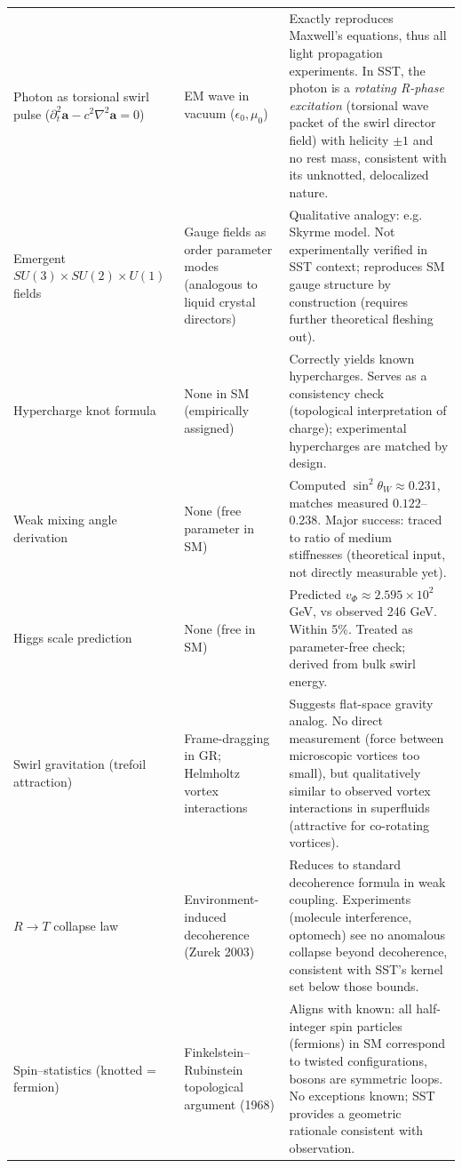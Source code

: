\documentclass[10pt,reprint,aps,onecolumn,nofootinbib]{revtex4-2}
\begin{document}
\begin{table}[hbt!]
\begin{ruledtabular}
\begin{tabular}{|p{3.0cm} p{4.0cm} p{8.0cm}|}
                Photon as torsional swirl pulse
                ($\partial_t^2 \mathbf{a}-c^2\nabla^2\mathbf{a}=0$)
                & EM wave in vacuum ($\epsilon_0,\mu_0$)
                & Exactly reproduces Maxwell’s equations, thus all light propagation experiments. In SST, the photon is a \emph{rotating R-phase excitation} (torsional wave packet of the swirl director field) with helicity $\pm 1$ and no rest mass, consistent with its unknotted, delocalized nature. \\
                Emergent $SU(3)\times SU(2)\times U(1)$ fields & Gauge fields as order parameter modes (analogous to liquid crystal directors) & Qualitative analogy: e.g. Skyrme model. Not experimentally verified in SST context; reproduces SM gauge structure by construction (requires further theoretical fleshing out). \\
				Hypercharge knot formula & None in SM (empirically assigned) & Correctly yields known hypercharges. Serves as a consistency check (topological interpretation of charge); experimental hypercharges are matched by design. \\
				Weak mixing angle derivation & None (free parameter in SM) & Computed $\sin^2\theta_W \approx0.231$, matches measured $0.122$–$0.238$. Major success: traced to ratio of medium stiffnesses (theoretical input, not directly measurable yet). \\
				Higgs scale prediction & None (free in SM) & Predicted $v_{\Phi}\approx2.595\times10^2$ GeV, vs observed 246 GeV. Within 5\%. Treated as parameter-free check; derived from bulk swirl energy. \\
				Swirl gravitation (trefoil attraction) & Frame-dragging in GR; Helmholtz vortex interactions & Suggests flat-space gravity analog. No direct measurement (force between microscopic vortices too small), but qualitatively similar to observed vortex interactions in superfluids (attractive for co-rotating vortices). \\
				$R\to T$ collapse law & Environment-induced decoherence (Zurek 2003) & Reduces to standard decoherence formula in weak coupling. Experiments (molecule interference, optomech) see no anomalous collapse beyond decoherence, consistent with SST’s kernel set below those bounds. \\
				Spin–statistics (knotted = fermion) & Finkelstein–Rubinstein topological argument (1968) & Aligns with known: all half-integer spin particles (fermions) in SM correspond to twisted configurations, bosons are symmetric loops. No exceptions known; SST provides a geometric rationale consistent with observation. \\

\end{tabular}
\end{ruledtabular}
\end{table}
\end{document}

